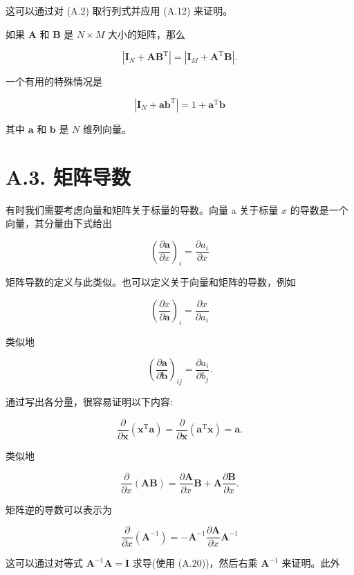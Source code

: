 \documentclass[10pt]{report}
\begin{document}
这可以通过对 (A.2) 取行列式并应用 (A.12) 来证明。

如果 \(\mathbf{A}\) 和 \(\mathbf{B}\) 是 \(N \times  M\) 大小的矩阵，那么

\[
\left| {{\mathbf{I}}_{N} + \mathbf{A}{\mathbf{B}}^{\mathrm{T}}}\right|  = \left| {{\mathbf{I}}_{M} + {\mathbf{A}}^{\mathrm{T}}\mathbf{B}}\right| . \tag{A.14}
\]

一个有用的特殊情况是

\[
\left| {{\mathbf{I}}_{N} + {\mathbf{{ab}}}^{\mathrm{T}}}\right|  = 1 + {\mathbf{a}}^{\mathrm{T}}\mathbf{b} \tag{A.15}
\]

其中 \(\mathbf{a}\) 和 \(\mathbf{b}\) 是 \(N\) 维列向量。

\section*{A.3. 矩阵导数}

有时我们需要考虑向量和矩阵关于标量的导数。向量 a 关于标量 \(x\) 的导数是一个向量，其分量由下式给出

\[
{\left( \frac{\partial \mathbf{a}}{\partial x}\right) }_{i} = \frac{\partial {a}_{i}}{\partial x} \tag{A.16}
\]

矩阵导数的定义与此类似。也可以定义关于向量和矩阵的导数，例如

\[
{\left( \frac{\partial x}{\partial \mathbf{a}}\right) }_{i} = \frac{\partial x}{\partial {a}_{i}} \tag{A.17}
\]

类似地

\[
{\left( \frac{\partial \mathbf{a}}{\partial \mathbf{b}}\right) }_{ij} = \frac{\partial {a}_{i}}{\partial {b}_{j}}. \tag{A.18}
\]

通过写出各分量，很容易证明以下内容:

\[
\frac{\partial }{\partial \mathbf{x}}\left( {{\mathbf{x}}^{\mathrm{T}}\mathbf{a}}\right)  = \frac{\partial }{\partial \mathbf{x}}\left( {{\mathbf{a}}^{\mathrm{T}}\mathbf{x}}\right)  = \mathbf{a}. \tag{A.19}
\]

类似地

\[
\frac{\partial }{\partial x}\left( \mathbf{{AB}}\right)  = \frac{\partial \mathbf{A}}{\partial x}\mathbf{B} + \mathbf{A}\frac{\partial \mathbf{B}}{\partial x}. \tag{A.20}
\]

矩阵逆的导数可以表示为

\[
\frac{\partial }{\partial x}\left( {\mathbf{A}}^{-1}\right)  =  - {\mathbf{A}}^{-1}\frac{\partial \mathbf{A}}{\partial x}{\mathbf{A}}^{-1} \tag{A.21}
\]

这可以通过对等式 \({\mathbf{A}}^{-1}\mathbf{A} = \mathbf{I}\) 求导(使用 (A.20))，然后右乘 \({\mathbf{A}}^{-1}\) 来证明。此外
\end{document}
